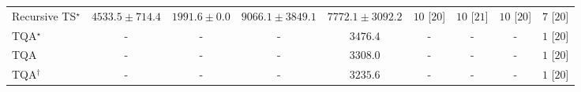 \begin{tabular}{l|cccc|cccc|}
Recursive TS$^\star$ & {\cellcolor[HTML]{9FBAD9}} \color[HTML]{000000} $4533.5\pm 714.4$ & {\cellcolor[HTML]{F5EEF6}} \color[HTML]{000000} $1991.6\pm 0.0$ & {\cellcolor[HTML]{023F64}} \color[HTML]{F1F1F1} $9066.1\pm 3849.1$ & {\cellcolor[HTML]{0566A0}} \color[HTML]{F1F1F1} $7772.1\pm 3092.2$ & {\cellcolor[HTML]{49006A}} \color[HTML]{F1F1F1} $10$ [$20$] & {\cellcolor[HTML]{49006A}} \color[HTML]{F1F1F1} $10$ [$21$] & {\cellcolor[HTML]{49006A}} \color[HTML]{F1F1F1} $10$ [$20$] & {\cellcolor[HTML]{CD238F}} \color[HTML]{F1F1F1} $7$ [$20$] \\
TQA$^\star$ & {\cellcolor[HTML]{000000}} \color[HTML]{F1F1F1} {\cellcolor{white}} \color{black} - & {\cellcolor[HTML]{000000}} \color[HTML]{F1F1F1} {\cellcolor{white}} \color{black} - & {\cellcolor[HTML]{000000}} \color[HTML]{F1F1F1} {\cellcolor{white}} \color{black} - & {\cellcolor[HTML]{CDD0E5}} \color[HTML]{000000} $3476.4$ & {\cellcolor[HTML]{000000}} \color[HTML]{F1F1F1} {\cellcolor{white}} \color{black} - & {\cellcolor[HTML]{000000}} \color[HTML]{F1F1F1} {\cellcolor{white}} \color{black} - & {\cellcolor[HTML]{000000}} \color[HTML]{F1F1F1} {\cellcolor{white}} \color{black} - & {\cellcolor[HTML]{FFF7F3}} \color[HTML]{000000} $1$ [$20$] \\
TQA & {\cellcolor[HTML]{000000}} \color[HTML]{F1F1F1} {\cellcolor{white}} \color{black} - & {\cellcolor[HTML]{000000}} \color[HTML]{F1F1F1} {\cellcolor{white}} \color{black} - & {\cellcolor[HTML]{000000}} \color[HTML]{F1F1F1} {\cellcolor{white}} \color{black} - & {\cellcolor[HTML]{D3D4E7}} \color[HTML]{000000} $3308.0$ & {\cellcolor[HTML]{000000}} \color[HTML]{F1F1F1} {\cellcolor{white}} \color{black} - & {\cellcolor[HTML]{000000}} \color[HTML]{F1F1F1} {\cellcolor{white}} \color{black} - & {\cellcolor[HTML]{000000}} \color[HTML]{F1F1F1} {\cellcolor{white}} \color{black} - & {\cellcolor[HTML]{FFF7F3}} \color[HTML]{000000} $1$ [$20$] \\
TQA$^\dagger$ & {\cellcolor[HTML]{000000}} \color[HTML]{F1F1F1} {\cellcolor{white}} \color{black} - & {\cellcolor[HTML]{000000}} \color[HTML]{F1F1F1} {\cellcolor{white}} \color{black} - & {\cellcolor[HTML]{000000}} \color[HTML]{F1F1F1} {\cellcolor{white}} \color{black} - & {\cellcolor[HTML]{D5D5E8}} \color[HTML]{000000} $3235.6$ & {\cellcolor[HTML]{000000}} \color[HTML]{F1F1F1} {\cellcolor{white}} \color{black} - & {\cellcolor[HTML]{000000}} \color[HTML]{F1F1F1} {\cellcolor{white}} \color{black} - & {\cellcolor[HTML]{000000}} \color[HTML]{F1F1F1} {\cellcolor{white}} \color{black} - & {\cellcolor[HTML]{FFF7F3}} \color[HTML]{000000} $1$ [$20$] \\
\cline{1-9}
\bottomrule
\end{tabular}

